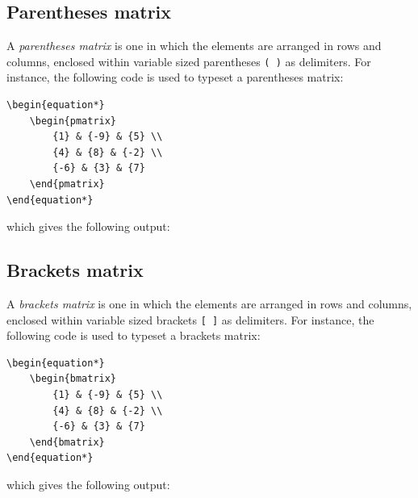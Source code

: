 	\subsection{Parentheses matrix}
		A \emph{parentheses matrix} is one in which the elements are arranged in rows and columns, enclosed within variable sized parentheses \lstinline|( )| as delimiters. For instance, the following code is used to typeset a parentheses matrix:
\begin{lstlisting}
\begin{equation*}
	\begin{pmatrix}
		{1} & {-9} & {5} \\
		{4} & {8} & {-2} \\
		{-6} & {3} & {7}
	\end{pmatrix}
\end{equation*}
\end{lstlisting}
		which gives the following output:
		
	\subsection{Brackets matrix}
		A \emph{brackets matrix} is one in which the elements are arranged in rows and columns, enclosed within variable sized brackets \lstinline|[ ]| as delimiters. For instance, the following code is used to typeset a brackets matrix:
\begin{lstlisting}
\begin{equation*}
	\begin{bmatrix}
		{1} & {-9} & {5} \\
		{4} & {8} & {-2} \\
		{-6} & {3} & {7}
	\end{bmatrix}
\end{equation*}
\end{lstlisting}
		which gives the following output:
		
